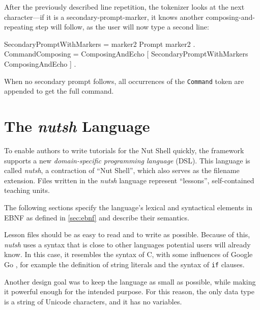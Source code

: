 \documentclass[paper=a4,twoside,abstract=on,cleardoublepage=empty,numbers=noenddot,toc=bib,12pt,appendixprefix=true]{scrreprt}
\begin{document}
After the previously described line repetition, the tokenizer looks at the next character---if it is a secondary-prompt-marker, it knows another composing-and-repeating step will follow, as the user will now type a second line:

\begin{ebnf}
SecondaryPromptWithMarkers = marker2 Prompt marker2 .
CommandComposing = ComposingAndEcho
    [ { SecondaryPromptWithMarkers ComposingAndEcho } ] .
\end{ebnf}
%
When no secondary prompt follows, all occurrences of the \texttt{Command} token are appended to get the full command.

\chapter{The \emph{nutsh} Language}
\label{sec:lang}

To enable authors to write tutorials for the Nut Shell quickly, the framework supports a new \emph{domain-specific programming language} (\textsc{DSL}). This language is called \emph{nutsh}, a contraction of “Nut Shell”, which also serves as the filename extension. Files written in the \emph{nutsh} language represent “lessons”, self-contained teaching units.



The following sections specify the language's lexical and syntactical elements in \textsc{EBNF} as defined in \cref{sec:ebnf} and describe their semantics.

Lesson files should be as easy to read and to write as possible. Because of this, \emph{nutsh} uses a syntax that is close to other languages potential users will already know. In this case, it resembles the syntax of C, with some influences of Google Go \cite{google13}, for example the definition of string literals and the syntax of \texttt{if} clauses.

Another design goal was to keep the language as small as possible, while making it powerful enough for the intended purpose. For this reason, the only data type is a string of Unicode characters, and it has no variables.
\end{document}
